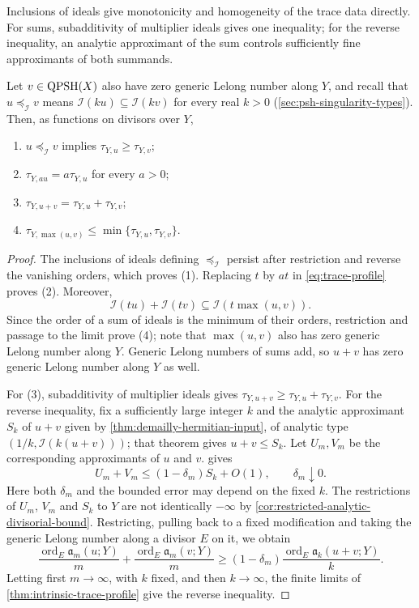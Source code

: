 Inclusions of ideals give monotonicity and homogeneity of the trace data directly. For sums, subadditivity of multiplier ideals gives one inequality; for the reverse inequality, an analytic approximant of the sum controls sufficiently fine approximants of both summands.

\begin{proposition}\label{prop:trace-profile-calculus}\label{thm:trace-data-additivity}
Let $v\in\mathrm{QPSH}(X)$ also have zero generic Lelong number along $Y$, and recall that $u\preceq_{\mathcal I}v$ means $\mathcal I(ku)\subseteq\mathcal I(kv)$ for every real $k>0$ (\cref{sec:psh-singularity-types}). Then, as functions on divisors over $Y$,
\begin{enumerate}
\item $u\preceq_{\mathcal I}v$ implies $\tau_{Y,u}\geq\tau_{Y,v}$;
\item $\tau_{Y,au}=a\tau_{Y,u}$ for every $a>0$;
\item $\tau_{Y,u+v}=\tau_{Y,u}+\tau_{Y,v}$;
\item $\tau_{Y,\max(u,v)}\leq\min\{\tau_{Y,u},\tau_{Y,v}\}$.
\end{enumerate}
\end{proposition}
\begin{proof}
The inclusions of ideals defining $\preceq_{\mathcal I}$ persist after restriction and reverse the vanishing orders, which proves (1). Replacing $t$ by $at$ in \eqref{eq:trace-profile} proves (2). Moreover,
\[
 \mathcal I(tu)+\mathcal I(tv)\subseteq\mathcal I(t\max(u,v)).
\]
Since the order of a sum of ideals is the minimum of their orders, restriction and passage to the limit prove (4); note that $\max(u,v)$ also has zero generic Lelong number along $Y$. Generic Lelong numbers of sums add, so $u+v$ has zero generic Lelong number along $Y$ as well.

For (3), subadditivity of multiplier ideals gives $\tau_{Y,u+v}\geq\tau_{Y,u}+\tau_{Y,v}$. For the reverse inequality, fix a sufficiently large integer $k$ and the analytic approximant $S_k$ of $u+v$ given by \cref{thm:demailly-hermitian-input}, of analytic type $(1/k,\mathcal I(k(u+v)))$; that theorem gives $u+v\leq S_k$. Let $U_m,V_m$ be the corresponding approximants of $u$ and $v$.  gives
\[
 U_m+V_m\leq(1-\delta_m)S_k+O(1),\qquad\delta_m\downarrow0.
\]
Here both $\delta_m$ and the bounded error may depend on the fixed $k$. The restrictions of $U_m$, $V_m$ and $S_k$ to $Y$ are not identically $-\infty$ by \cref{cor:restricted-analytic-divisorial-bound}. Restricting, pulling back to a fixed modification and taking the generic Lelong number along a divisor $E$ on it, we obtain
\[
 \frac{\operatorname{ord}_E\mathfrak a_m(u;Y)}m
 +\frac{\operatorname{ord}_E\mathfrak a_m(v;Y)}m
 \geq(1-\delta_m)
       \frac{\operatorname{ord}_E\mathfrak a_k(u+v;Y)}k.
\]
Letting first $m\to\infty$, with $k$ fixed, and then $k\to\infty$, the finite limits of \cref{thm:intrinsic-trace-profile} give the reverse inequality.
\end{proof}
